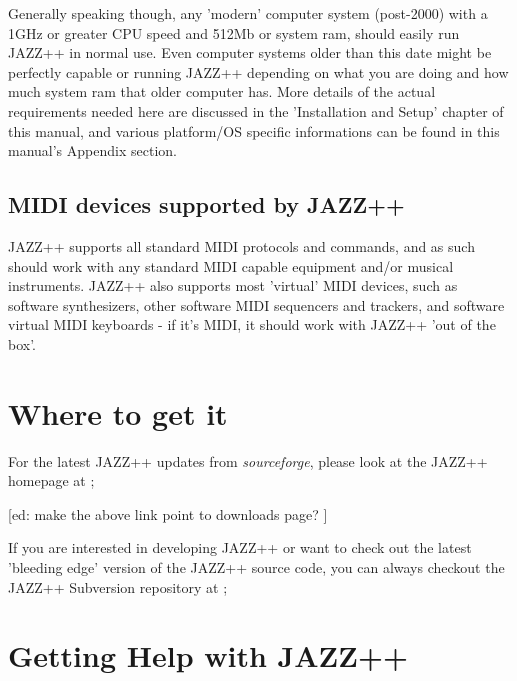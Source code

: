 \documentclass[letterpaper]{report}
\begin{document}
Generally speaking though, any 'modern' computer system (post-2000) with a
1GHz or greater CPU speed and 512Mb or system ram, should easily run JAZZ++
in normal use. Even computer systems older than this date might be perfectly
capable or running JAZZ++ depending on what you are doing and how much system
ram that older computer has. More details of the actual requirements needed here
are discussed in the 'Installation and Setup' chapter of this manual, and
various platform/OS specific informations can be found in this manual's
Appendix section. 

\subsection{MIDI devices supported by JAZZ++}

JAZZ++ supports all standard MIDI protocols and commands, and as such should
work with any standard MIDI capable equipment and/or musical instruments. JAZZ++
also supports most 'virtual' MIDI devices, such as software synthesizers, other
software MIDI sequencers and trackers, and software virtual MIDI keyboards - if
it's MIDI, it should work with JAZZ++ 'out of the box'.


\section{Where to get it}\label{wheretoget}

For the latest JAZZ++ updates from {\em sourceforge}, please look at the JAZZ++
homepage at ;

\begin{indented}{2cm}
\end{indented}

[ed: make the above link point to downloads page? ]

If you are interested in developing JAZZ++ or want to check out the latest
'bleeding edge' version of the JAZZ++ source code, you can always checkout the
JAZZ++ Subversion repository at ;

\begin{indented}{2cm}
\end{indented}

\section{Getting Help with JAZZ++}
\end{document}
